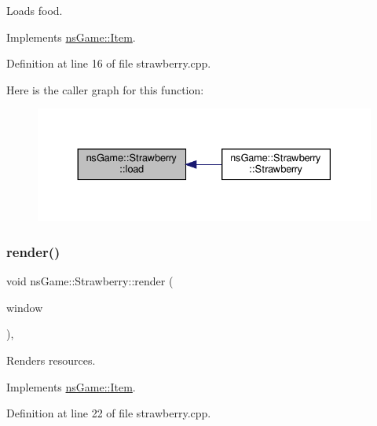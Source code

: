 Loads food. 



Implements \hyperlink{structns_game_1_1_item_a5887b6e9225ae8a276801225eca83808}{ns\+Game\+::\+Item}.



Definition at line 16 of file strawberry.\+cpp.

Here is the caller graph for this function\+:
\nopagebreak
\begin{figure}[H]
\begin{center}
\leavevmode
\includegraphics[width=330pt]{classns_game_1_1_strawberry_a0db46752979078f7bc64703425887ff5_icgraph}
\end{center}
\end{figure}
\mbox{\label{classns_game_1_1_strawberry_a7d4b1b56782cdca38e37a0ea254f7dc5}} 
\subsubsection{\texorpdfstring{render()}{render()}}
{\footnotesize\ttfamily void ns\+Game\+::\+Strawberry\+::render (\begin{DoxyParamCaption}\item[{Min\+GL \&}]{window }\end{DoxyParamCaption})\hspace{0.3cm}{\ttfamily [override]}, {\ttfamily [virtual]}}



Renders resources. 



Implements \hyperlink{structns_game_1_1_item_a451b6491efc475c9ca47dcccdbbde707}{ns\+Game\+::\+Item}.



Definition at line 22 of file strawberry.\+cpp.

